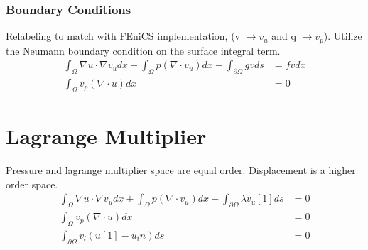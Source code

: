 \documentclass[12pt,3p]{article}
\begin{document}
\subsubsection{Boundary Conditions}
 Relabeling to match with FEniCS implementation, (v $\rightarrow v_u$ and q $\rightarrow v_p$). Utilize the Neumann boundary condition on the surface integral term.
\begin{align*}
\int_{\Omega} \nabla u \cdot \nabla v_u dx +  \int_{\Omega} p (\nabla \cdot v_u) dx - \int_{\partial \Omega} g v ds &= f v dx \\
\int_{\Omega} v_p (\nabla \cdot u) dx &= 0 
\end{align*}

\section{Lagrange Multiplier}
Pressure and lagrange multiplier space are equal order. Displacement is a higher order space. 
\begin{align*}
\int_{\Omega} \nabla u \cdot \nabla v_u dx +  \int_{\Omega} p (\nabla \cdot v_u) dx + \int_{\partial \Omega} \lambda v_u[1] ds &= 0 \\
\int_{\Omega} v_p (\nabla \cdot u) dx &= 0 \\ 
\int_{\partial \Omega} v_l (u[1] - u_in) ds &= 0 
\end{align*}
\end{document}
